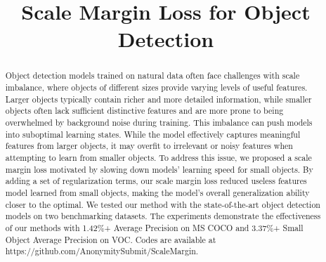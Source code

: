 \documentclass{article}
\begin{document}
\sloppy

\def\x{{\mathbf x}}
\def\L{{\cal L}}

\title{Scale Margin Loss for Object Detection}
\address{
}

\maketitle

\begin{abstract}
%
%
Object detection models trained on natural data often face challenges with scale imbalance, where objects of different sizes provide varying levels of useful features. 
Larger objects typically contain richer and more detailed information, while smaller objects often lack sufficient distinctive features and are more prone to being overwhelmed by background noise during training. 
This imbalance can push models into suboptimal learning states. While the model effectively captures meaningful features from larger objects, it may overfit to irrelevant or noisy features when attempting to learn from smaller objects. 
To address this issue, we proposed a scale margin loss motivated by slowing down models' learning speed for small objects. By adding a set of regularization terms, our scale margin loss reduced useless features model learned from small objects, making the model's overall generalization ability closer to the optimal. We tested our method with the state-of-the-art object detection models %
on two benchmarking datasets. The experiments demonstrate the effectiveness of our methods with 1.42\%+ Average Precision on MS COCO and 3.37\%+ Small Object Average Precision on VOC. Codes are available at https://github.com/AnonymitySubmit/ScaleMargin.
\end{abstract}
\end{document}
